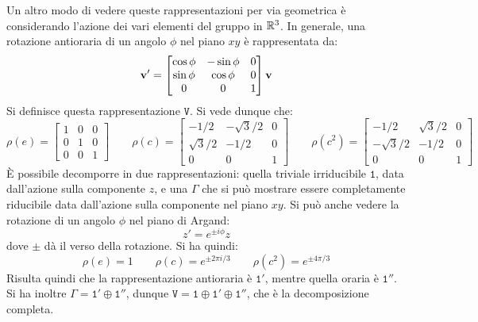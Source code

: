 Un altro modo di vedere queste rappresentazioni per via geometrica è considerando l'azione dei vari elementi del gruppo in $ \mathbb{R}^3 $. In generale, una rotazione antioraria di un angolo $ \phi $ nel piano $ xy $ è rappresentata da:
\begin{equation}
	\mathbf{v}' =
	\begin{bmatrix}
		\cos \phi & -\sin \phi & 0 \\
		\sin \phi & \cos \phi & 0 \\
		0 & 0 & 1
	\end{bmatrix}
	\mathbf{v}
	\label{eq:8.27}
\end{equation}
Si definisce questa rappresentazione $ \mathtt{V} $. Si vede dunque che:
\begin{equation*}
	\rho(e) =
	\begin{bmatrix}
		1 & 0 & 0 \\
		0 & 1 & 0 \\
		0 & 0 & 1
	\end{bmatrix}
	\qquad
	\rho(c) =
	\begin{bmatrix}
		-1/2 & -\sqrt{3}/2 & 0 \\
		\sqrt{3}/2 & -1/2 & 0 \\
		0 & 0 & 1
	\end{bmatrix}
	\qquad
	\rho(c^2) =
	\begin{bmatrix}
		-1/2 & \sqrt{3}/2 & 0 \\
		-\sqrt{3}/2 & -1/2 & 0 \\
		0 & 0 & 1
	\end{bmatrix}
\end{equation*}
È possibile decomporre in due rappresentazioni: quella triviale irriducibile $ \mathtt{1} $, data dall'azione sulla componente $ z $, e una $ \Gamma $ che si può mostrare essere completamente riducibile data dall'azione sulla componente nel piano $ xy $.
Si può anche vedere la rotazione di un angolo $ \phi $ nel piano di Argand:
\begin{equation}
	z' = e^{\pm i\phi} z
	\label{eq:8.28}
\end{equation}
dove $ \pm $ dà il verso della rotazione. Si ha quindi:
\begin{equation*}
	\rho(e) = 1
	\qquad
	\rho(c) = e^{\pm 2\pi i / 3}
	\qquad
	\rho(c^2) = e^{\pm 4\pi / 3}
\end{equation*}
Risulta quindi che la rappresentazione antioraria è $ \mathtt{1}' $, mentre quella oraria è $ \mathtt{1}'' $. Si ha inoltre $ \Gamma = \mathtt{1}' \oplus \mathtt{1}'' $, dunque $ \mathtt{V} = \mathtt{1} \oplus \mathtt{1}' \oplus \mathtt{1}'' $, che è la decomposizione completa.

